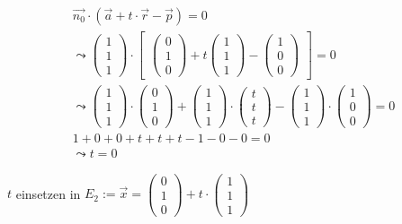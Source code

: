 \begin{gather}
\vec{n_0} \cdot (\vec{a}+t\cdot \vec{r}-\vec{p})=0\\
\leadsto 
\begin{pmatrix}
1\\1\\1
\end{pmatrix} \cdot 
\begin{bmatrix}
\begin{pmatrix}
0\\1\\0
\end{pmatrix}
+ t
\begin{pmatrix}
1\\1\\1
\end{pmatrix}
-
\begin{pmatrix}
1\\0\\0
\end{pmatrix}
\end{bmatrix} = 0\\
\leadsto
\begin{pmatrix}
1\\1\\1
\end{pmatrix}\cdot
\begin{pmatrix}
0\\1\\0
\end{pmatrix}
+
\begin{pmatrix}
1\\1\\1
\end{pmatrix}
\cdot
\begin{pmatrix}
t\\t\\t
\end{pmatrix}
-
\begin{pmatrix}
1\\1\\1
\end{pmatrix}
\cdot
\begin{pmatrix}
1\\0\\0
\end{pmatrix} =0\\
1+0+0+t+t+t-1-0-0=0\\
\leadsto t=0
\end{gather}

\ensuremath{t} einsetzen in \ensuremath{E_2:= \vec{x}=\begin{pmatrix}
		0\\1\\0
	\end{pmatrix} +t\cdot\begin{pmatrix}
		1\\1\\1
\end{pmatrix}}\\

